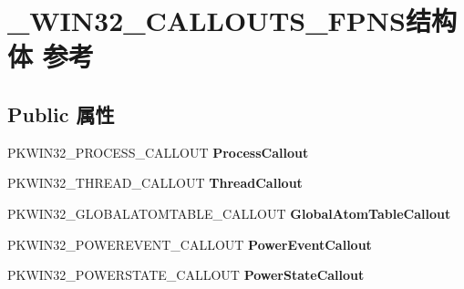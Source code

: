 \hypertarget{struct___w_i_n32___c_a_l_l_o_u_t_s___f_p_n_s}{}\section{\+\_\+\+W\+I\+N32\+\_\+\+C\+A\+L\+L\+O\+U\+T\+S\+\_\+\+F\+P\+N\+S结构体 参考}
\label{struct___w_i_n32___c_a_l_l_o_u_t_s___f_p_n_s}
\subsection*{Public 属性}
\begin{DoxyCompactItemize}
\item 
\mbox{\label{struct___w_i_n32___c_a_l_l_o_u_t_s___f_p_n_s_a1767eebb8b1e1a561f41792d685f6c4a}} 
P\+K\+W\+I\+N32\+\_\+\+P\+R\+O\+C\+E\+S\+S\+\_\+\+C\+A\+L\+L\+O\+UT {\bfseries Process\+Callout}
\item 
\mbox{\label{struct___w_i_n32___c_a_l_l_o_u_t_s___f_p_n_s_ad267216106f4820a272b069e8b4f991c}} 
P\+K\+W\+I\+N32\+\_\+\+T\+H\+R\+E\+A\+D\+\_\+\+C\+A\+L\+L\+O\+UT {\bfseries Thread\+Callout}
\item 
\mbox{\label{struct___w_i_n32___c_a_l_l_o_u_t_s___f_p_n_s_ab0b139087882e1774cd18154b3f1941e}} 
P\+K\+W\+I\+N32\+\_\+\+G\+L\+O\+B\+A\+L\+A\+T\+O\+M\+T\+A\+B\+L\+E\+\_\+\+C\+A\+L\+L\+O\+UT {\bfseries Global\+Atom\+Table\+Callout}
\item 
\mbox{\label{struct___w_i_n32___c_a_l_l_o_u_t_s___f_p_n_s_a0693d8794c7202719c590a4078b4db60}} 
P\+K\+W\+I\+N32\+\_\+\+P\+O\+W\+E\+R\+E\+V\+E\+N\+T\+\_\+\+C\+A\+L\+L\+O\+UT {\bfseries Power\+Event\+Callout}
\item 
\mbox{\label{struct___w_i_n32___c_a_l_l_o_u_t_s___f_p_n_s_aa66d6c7fe86deede54dd89e4c77eac26}} 
P\+K\+W\+I\+N32\+\_\+\+P\+O\+W\+E\+R\+S\+T\+A\+T\+E\+\_\+\+C\+A\+L\+L\+O\+UT {\bfseries Power\+State\+Callout}
\item 
\mbox{\label{struct___w_i_n32___c_a_l_l_o_u_t_s___f_p_n_s_afc0432040fd42e339931d0b9606174a5}} 

\end{DoxyCompactItemize}

